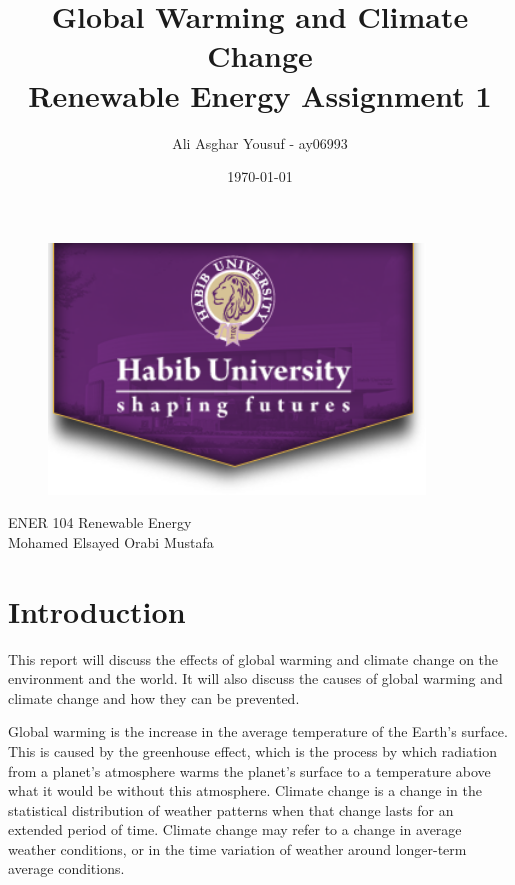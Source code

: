 \documentclass{article}
\title{\huge{\textbf{Global Warming and Climate Change}}\\
    \LARGE{Renewable Energy Assignment 1}}
\author{Ali Asghar Yousuf - ay06993}
\date{\today}
\begin{document}
\clearpage\maketitle
\thispagestyle{empty}
\begin{center}
    \begin{figure}[h]
        \centering
        \includegraphics[width=10cm]{hu_logo.png}
        \label{fig:logo}
    \end{figure}
    \large{ENER 104 Renewable Energy \\
        Mohamed Elsayed Orabi Mustafa}
\end{center}
\newpage
\setcounter{page}{1}
\tableofcontents

\newpage
{} %

\section{Introduction}
This report will discuss the effects of global warming and climate change on
the environment and the world. It will also discuss the causes of global
warming and climate change and how they can be prevented.

Global warming is the increase in the average temperature of the Earth's
surface. This is caused by the greenhouse effect, which is the process by which
radiation from a planet's atmosphere warms the planet's surface to a
temperature above what it would be without this atmosphere. Climate change is a
change in the statistical distribution of weather patterns when that change
lasts for an extended period of time. Climate change may refer to a change in
average weather conditions, or in the time variation of weather around
longer-term average conditions.
\end{document}
